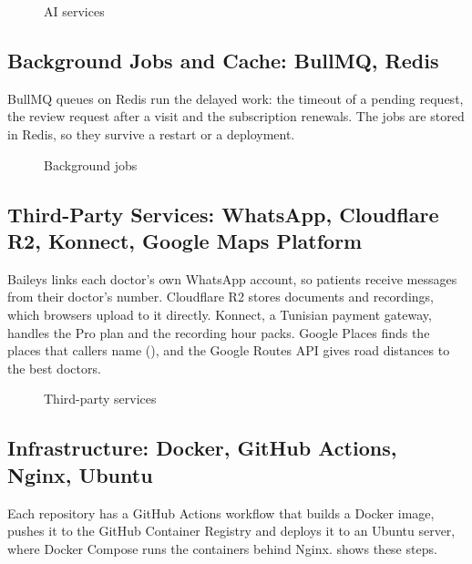 \begin{figure}[H]
    \centering
    \hspace{1cm}
    \hspace{1cm}
    \caption{AI services}
    \label{fig:logos_ai}
\end{figure}

\subsection{Background Jobs and Cache: BullMQ, Redis}
BullMQ queues on Redis run the delayed work: the timeout of a pending request, the review request after a visit and the subscription renewals. The jobs are stored in Redis, so they survive a restart or a deployment.

\begin{figure}[H]
    \centering
    \hspace{1cm}
    \caption{Background jobs}
    \label{fig:logos_jobs}
\end{figure}

\subsection{Third-Party Services: WhatsApp, Cloudflare R2, Konnect, Google Maps Platform}
Baileys links each doctor's own WhatsApp account, so patients receive messages from their doctor's number. Cloudflare R2 stores documents and recordings, which browsers upload to it directly. Konnect, a Tunisian payment gateway, handles the Pro plan and the recording hour packs. Google Places finds the places that callers name (), and the Google Routes API gives road distances to the best doctors.

\begin{figure}[H]
    \centering
    \hfill
    \hfill
    \hfill
    \caption{Third-party services}
    \label{fig:logos_thirdparty}
\end{figure}

\subsection{Infrastructure: Docker, GitHub Actions, Nginx, Ubuntu}
Each repository has a GitHub Actions workflow that builds a Docker image, pushes it to the GitHub Container Registry and deploys it to an Ubuntu server, where Docker Compose runs the containers behind Nginx.  shows these steps.


